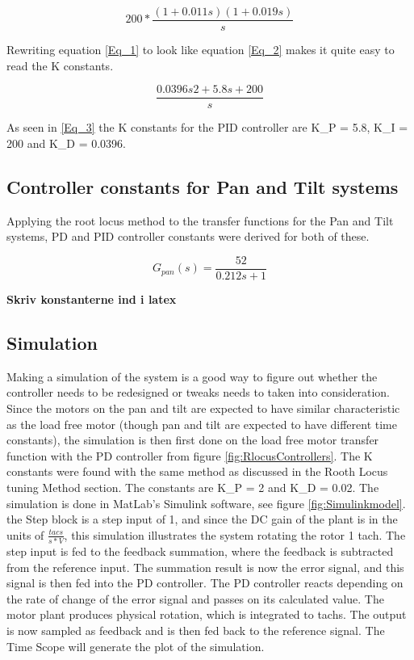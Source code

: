 \begin{equation}
200*\frac{(1+0.011s)(1+0.019s)}{s}
\label{Eq_1} 
\end{equation}

Rewriting equation \ref{Eq_1} to look like equation \ref{Eq_2} makes it quite easy to read the K constants.

\begin{equation}
\frac{0.0396s2 +5.8s+200}{s}
\label{Eq_3}
\end{equation}

As seen in \ref{Eq_3} the K constants for the PID controller are K\_P = 5.8, K\_I = 200 and K\_D = 0.0396.

\subsection{Controller constants for Pan and Tilt systems}

Applying the root locus method to the transfer functions for the Pan and Tilt systems, PD and PID controller constants were derived for both of these.

\begin{equation}
G_{pan}(s)=\frac{52}{0.212s+1}
\end{equation}


\textbf{Skriv konstanterne ind i latex}


\subsection{Simulation}

Making a simulation of the system is a good way to figure out whether the controller needs to be redesigned or tweaks needs to taken into consideration. Since the motors on the pan and tilt are expected to have similar characteristic as the load free motor (though pan and tilt are expected to have different time constants), the simulation is then first done on the load free motor transfer function with the PD controller from figure \ref{fig:RlocusControllers}. The K constants were found with the same method as discussed in the Rooth Locus tuning Method section. The constants are K\_P = 2 and K\_D = 0.02.
The simulation is done in MatLab’s Simulink software, see figure \ref{fig:Simulinkmodel}. the Step block is a step input of 1, and since the DC gain of the plant is in the units of $\frac{tacs}{s*V}$, this simulation illustrates the system rotating the rotor 1 tach. The step input is fed to the feedback summation, where the feedback is subtracted from the reference input. The summation result is now the error signal, and this signal is then fed into the PD controller. The PD controller reacts depending on the rate of change of the error signal and passes on its calculated value. The motor plant produces physical rotation, which is integrated to tachs. The output is now sampled as feedback and is then fed back to the reference signal. The Time Scope will generate the plot of the simulation.

